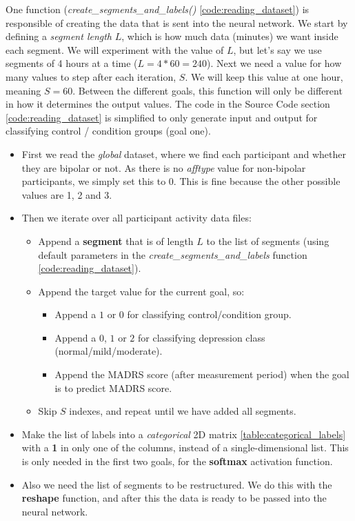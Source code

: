 One function (\textit{create\_segments\_and\_labels()} \ref{code:reading_dataset}) is responsible of creating the data that is sent into the neural network. 
We start by defining a \textit{segment length} $L$, which is how much data (minutes) we want inside each segment. We will experiment with the value of $L$, 
but let's say we use segments of 4 hours at a time ($L=4*60=240$). Next we need a value for how many values to step after each iteration, $S$. 
We will keep this value at one hour, meaning $S=60$. Between the different goals, this function will only be different in how it determines the output values.
The code in the Source Code section \ref{code:reading_dataset} is simplified to only generate input and output for 
classifying control / condition groups (goal one).

\begin{itemize}
  \item First we read the \textit{global} dataset, where we find each participant and whether they are bipolar or not. As there is no \textit{afftype} value
        for non-bipolar participants, we simply set this to 0. This is fine because the other possible values are 1, 2 and 3.
  \item Then we iterate over all participant activity data files:
  \begin{itemize}
    \item Append a \textbf{segment} that is of length $L$ to the list of segments (using default parameters in the
          \textit{create\_segments\_and\_labels} function \ref{code:reading_dataset}).
    \item Append the target value for the current goal, so:
      \begin{itemize}
            \item Append a $1$ or $0$ for classifying control/condition group.
            \item Append a $0$, $1$ or $2$ for classifying depression class \\(normal/mild/moderate).
            \item Append the MADRS score (after measurement period) when the goal is to predict MADRS score.
      \end{itemize}  
    \item Skip $S$ indexes, and repeat until we have added all segments.
  \end{itemize}
  \item Make the list of labels into a \textit{categorical} 2D matrix \ref{table:categorical_labels} with a \textbf{1} in only one of the columns,
        instead of a single-dimensional list.
        This is only needed in the first two goals, for the \textbf{softmax} activation function.
  \item Also we need the list of segments to be restructured. We do this with the \textbf{reshape} function, 
        and after this the data is ready to be passed into the neural network.
\end{itemize}

